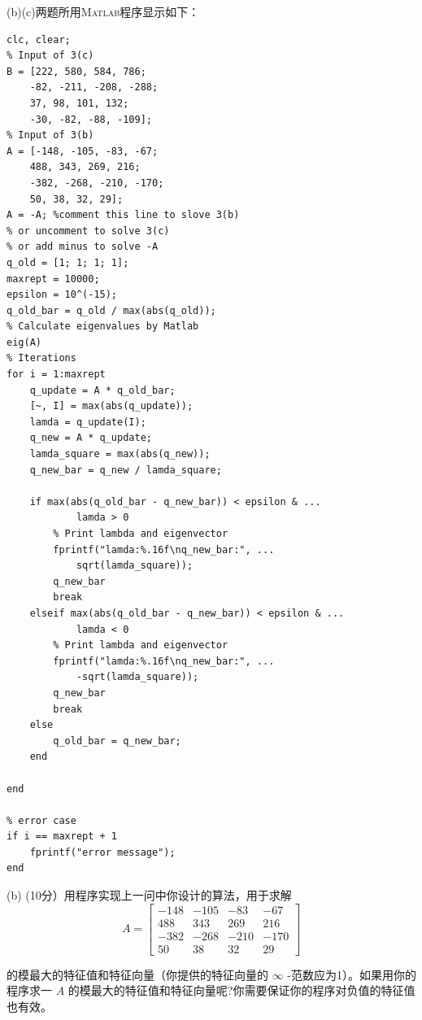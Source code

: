 \documentclass[12pt,a4paper,UTF8]{ctexart}
\begin{document}
\begin{enumerate}
          (b)(c)两题所用\textsc{Matlab}程序显示如下：
          \begin{lstlisting}[frame=single]
clc, clear;
% Input of 3(c)
B = [222, 580, 584, 786;
    -82, -211, -208, -288;
    37, 98, 101, 132;
    -30, -82, -88, -109];
% Input of 3(b)
A = [-148, -105, -83, -67;
    488, 343, 269, 216;
    -382, -268, -210, -170;
    50, 38, 32, 29];
A = -A; %comment this line to slove 3(b)
% or uncomment to solve 3(c)
% or add minus to solve -A
q_old = [1; 1; 1; 1];
maxrept = 10000;
epsilon = 10^(-15);
q_old_bar = q_old / max(abs(q_old));
% Calculate eigenvalues by Matlab
eig(A)
% Iterations
for i = 1:maxrept
    q_update = A * q_old_bar;
    [~, I] = max(abs(q_update));
    lamda = q_update(I);
    q_new = A * q_update;
    lamda_square = max(abs(q_new));
    q_new_bar = q_new / lamda_square;

    if max(abs(q_old_bar - q_new_bar)) < epsilon & ...
            lamda > 0
        % Print lambda and eigenvector
        fprintf("lamda:%.16f\nq_new_bar:", ...
            sqrt(lamda_square));
        q_new_bar
        break
    elseif max(abs(q_old_bar - q_new_bar)) < epsilon & ...
            lamda < 0
        % Print lambda and eigenvector
        fprintf("lamda:%.16f\nq_new_bar:", ...
            -sqrt(lamda_square));
        q_new_bar
        break
    else
        q_old_bar = q_new_bar;
    end

end

% error case
if i == maxrept + 1
    fprintf("error message");
end

        \end{lstlisting}
          (b) (10分）用程序实现上一问中你设计的算法，用于求解
          \begin{equation}
              A=\left[\begin{array}{rrrr}
                      -148 & -105 & -83  & -67  \\
                      488  & 343  & 269  & 216  \\
                      -382 & -268 & -210 & -170 \\
                      50   & 38   & 32   & 29
                  \end{array}\right]
          \end{equation}


          的模最大的特征值和特征向量（你提供的特征向量的 $\infty$ -范数应为1）。如果用你的程序求一 $A$ 的模最大的特征值和特征向量呢?你需要保证你的程序对负值的特征值也有效。


\end{enumerate}
\end{document}
